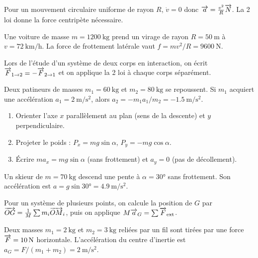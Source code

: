 Pour un mouvement circulaire uniforme de rayon $R$, $\dot{v}=0$ donc $\overrightarrow{a}=\frac{v^{2}}{R}\overrightarrow{N}$. La 2\ieme{} loi donne la force centripète nécessaire.
\begin{exemple}
Une voiture de masse $m=\SI{1200}{\kilogram}$ prend un virage de rayon $R=\SI{50}{\metre}$ à $v=\SI{72}{\kilo\metre\per\hour}$. La force de frottement latérale vaut $f=m v^{2}/R=\SI{9600}{\newton}$.
\end{exemple}

Lors de l’étude d’un système de deux corps en interaction, on écrit $\overrightarrow{F}_{1\to2}=-\overrightarrow{F}_{2\to1}$ et on applique la 2\ieme{} loi à chaque corps séparément.
\begin{exemple}
Deux patineurs de masses $m_1=\SI{60}{\kilogram}$ et $m_2=\SI{80}{\kilogram}$ se repoussent. Si $m_1$ acquiert une accélération $a_1=\SI{2}{\metre\per\second\squared}$, alors $a_2=-m_1 a_1/m_2=\SI{-1.5}{\metre\per\second\squared}$.
\end{exemple}

\begin{enumerate}
\item Orienter l’axe $x$ parallèlement au plan (sens de la descente) et $y$ perpendiculaire.
\item Projeter le poids : $P_x=mg\sin\alpha$, $P_y=-mg\cos\alpha$.
\item Écrire $ma_x=mg\sin\alpha$ (sans frottement) et $a_y=0$ (pas de décollement).
\end{enumerate}
\begin{exemple}
Un skieur de $m=\SI{70}{\kilogram}$ descend une pente à $\alpha=\ang{30}$ sans frottement. Son accélération est $a=g\sin\ang{30}=\SI{4.9}{\metre\per\second\squared}$.
\end{exemple}

Pour un système de plusieurs points, on calcule la position de $G$ par $\overrightarrow{OG}=\frac{1}{M}\sum m_i\overrightarrow{OM}_i$, puis on applique $M\overrightarrow{a}_G=\sum\overrightarrow{F}_{\text{ext}}$.
\begin{exemple}
Deux masses $m_1=\SI{2}{\kilogram}$ et $m_2=\SI{3}{\kilogram}$ reliées par un fil sont tirées par une force $\overrightarrow{F}=\SI{10}{\newton}$ horizontale. L’accélération du centre d’inertie est $a_G=F/(m_1+m_2)=\SI{2}{\metre\per\second\squared}$.
\end{exemple}

